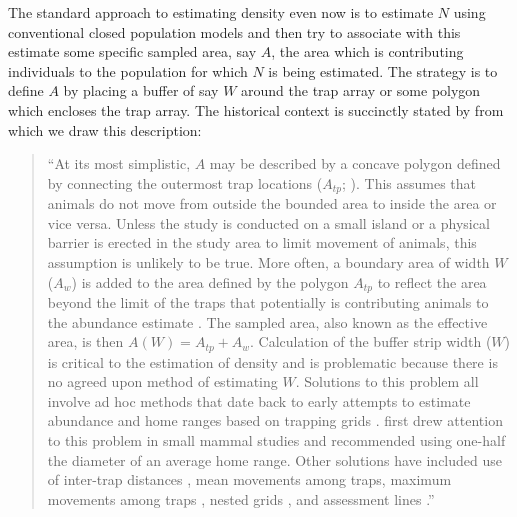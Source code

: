 The standard approach to estimating density even now is to estimate
$N$ using conventional closed population models \citep{otis_etal:1978}
and then try to associate with this estimate some specific sampled
area, say $A$, the area which is contributing individuals to the
population for which $N$ is being estimated. The strategy is to define
$A$ by placing a buffer of say $W$ around the trap array or some
polygon which encloses the trap array. The historical context is
succinctly stated by \citep{obrien:2011} from which we draw this
description:

\begin{quote}
  ``At its most simplistic, $A$ may be described by a concave polygon
  defined by connecting the outermost trap locations ($A_{tp}$;
  \citet{mohr:1947}).  This assumes that animals do not move from
  outside the bounded area to inside the area or vice versa. Unless
  the study is conducted on a small island or a physical barrier is
  erected in the study area to limit movement of animals, this
  assumption is unlikely to be true. More often, a boundary area of
  width $W$ ($A_{w}$) is added to the area defined by the polygon
  $A_{tp}$ to reflect the area beyond the limit of the traps that
  potentially is contributing animals to the abundance estimate
  \citep{otis_etal:1978}. The sampled area, also known as the
  effective area, is then $A(W) = A_{tp} + A_{w}$. Calculation of the
  buffer strip width ($W$) is critical to the estimation of density
  and is problematic because there is no agreed upon method of
  estimating $W$. Solutions to this problem all involve ad hoc methods
  that date back to early attempts to estimate abundance and home
  ranges based on trapping grids
  \citep[see][]{hayne:1949}. \citet{dice:1938} first drew attention to
  this problem in small mammal studies and recommended using one-half
  the diameter of an average home range. Other solutions have included
  use of inter-trap distances \citep{blair:1940, burt:1943}, mean
  movements among traps, maximum movements among traps
  \citep{holdenried:1940, hayne:1949}, nested grids
  \citep{otis_etal:1978}, and assessment lines
  \citep{smith_etal:1971}.''
\end{quote}

